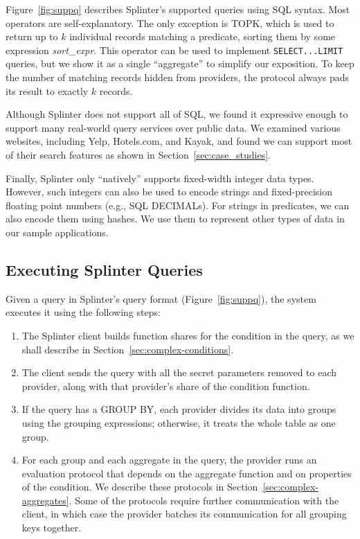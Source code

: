 Figure~\ref{fig:suppq} describes Splinter's supported queries using SQL syntax.
Most operators are self-explanatory.
The only exception is TOPK, which is used to return up to $k$ individual records
matching a predicate, sorting them by some expression \emph{sort\_expr}.
This operator can be used to implement \texttt{SELECT...LIMIT} queries, but
we show it as a single ``aggregate'' to simplify our exposition.
To keep the number of matching records hidden from providers, the
protocol always pads its result to exactly $k$ records.


Although Splinter does not support all of SQL, we found it expressive enough to
support many real-world query services over public data.
We examined various websites, including Yelp, Hotels.com, and Kayak, and found
we can support most of their search features as shown in Section~\ref{sec:case_studies}.

Finally, Splinter only ``natively'' supports fixed-width integer data
types. However, such integers can also be used to encode strings and
fixed-precision floating point numbers (e.g., SQL DECIMALs). 
For strings in predicates, we can also encode them using hashes.
We use them to represent other types of data in our sample applications.

\subsection{Executing Splinter Queries}
\label{sec:complex}

Given a query in Splinter's query format (Figure~\ref{fig:suppq}), the system executes
it using the following steps:

\begin{enumerate}
	\item The Splinter client builds function shares for the condition in the query,
	as we shall describe in Section~\ref{sec:complex-conditions}.
	\item The client sends the query with all the secret parameters removed to
	each provider, along with that provider's share of the condition function.
	\item If the query has a GROUP BY, each provider divides its data into
	groups using the grouping expressions; otherwise, it treats the whole table
	as one group.
	\item \label{agg-step}
	For each group and each aggregate in the query, the provider runs an
	evaluation protocol that depends on the aggregate function and on
	properties of the condition. We describe these protocols in
	Section~\ref{sec:complex-aggregates}.
	Some of the protocols require
	further communication with the client, in which case the provider
	batches its communication for all grouping keys together.
\end{enumerate}

